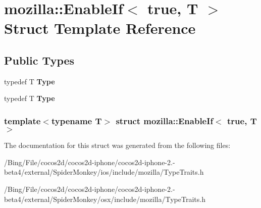 \hypertarget{structmozilla_1_1_enable_if_3_01true_00_01_t_01_4}{\section{mozilla\-:\-:Enable\-If$<$ true, T $>$ Struct Template Reference}
\label{structmozilla_1_1_enable_if_3_01true_00_01_t_01_4}
}
\subsection*{Public Types}
\begin{DoxyCompactItemize}
\item 
\hypertarget{structmozilla_1_1_enable_if_3_01true_00_01_t_01_4_a4a7ff99c00c16bd2c38760d0ede3c354}{typedef T {\bfseries Type}}\label{structmozilla_1_1_enable_if_3_01true_00_01_t_01_4_a4a7ff99c00c16bd2c38760d0ede3c354}

\item 
\hypertarget{structmozilla_1_1_enable_if_3_01true_00_01_t_01_4_a4a7ff99c00c16bd2c38760d0ede3c354}{typedef T {\bfseries Type}}\label{structmozilla_1_1_enable_if_3_01true_00_01_t_01_4_a4a7ff99c00c16bd2c38760d0ede3c354}

\end{DoxyCompactItemize}
\subsubsection*{template$<$typename T$>$ struct mozilla\-::\-Enable\-If$<$ true, T $>$}



The documentation for this struct was generated from the following files\-:\begin{DoxyCompactItemize}
\item 
/\-Bing/\-File/cocos2d/cocos2d-\/iphone/cocos2d-\/iphone-\/2.-\/beta4/external/\-Spider\-Monkey/ios/include/mozilla/Type\-Traits.\-h\item 
/\-Bing/\-File/cocos2d/cocos2d-\/iphone/cocos2d-\/iphone-\/2.-\/beta4/external/\-Spider\-Monkey/osx/include/mozilla/Type\-Traits.\-h\end{DoxyCompactItemize}
